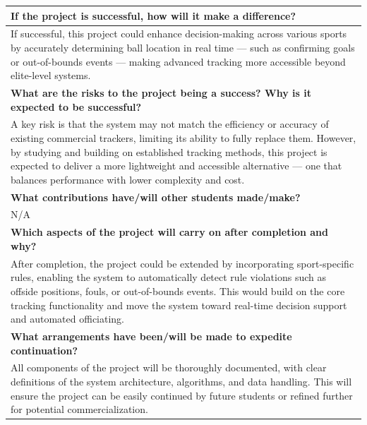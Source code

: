 \documentclass[12pt,a4paper]{article}
\newcommand\sumheading{%
	\rowcolor[gray]{.9}%
	\centering\arraybackslash%
	\bfseries\normalsize}
\begin{document}
\begin{longtable}{|p{\dimexpr \linewidth-2\tabcolsep-2\arrayrulewidth}|}
	\hline%
	\sumheading  If the project is successful, how will it make a difference? \\
	\hline%
	If successful, this project could enhance decision-making across various sports by accurately determining ball location in real time — such as confirming goals or out-of-bounds events — making advanced tracking more accessible beyond elite-level systems. \\[1ex]
	
	\hline%
	\sumheading  What are the risks to the project being a success? Why is it expected to be successful? \\
	\hline%
	A key risk is that the system may not match the efficiency or accuracy of existing commercial trackers, limiting its ability to fully replace them. However, by studying and building on established tracking methods, this project is expected to deliver a more lightweight and accessible alternative — one that balances performance with lower complexity and cost. \\[1ex]
	
	\hline%
	\sumheading  What contributions have/will other students made/make? \\
	\hline%
	N/A \\[1ex]
	
	\hline%
	\sumheading  Which aspects of the project will carry on after completion and why? \\
	\hline%
	After completion, the project could be extended by incorporating sport-specific rules, enabling the system to automatically detect rule violations such as offside positions, fouls, or out-of-bounds events. This would build on the core tracking functionality and move the system toward real-time decision support and automated officiating. \\[1ex]
	
	\hline%
	\sumheading  What arrangements have been/will be made to expedite continuation? \\
	\hline%
	All components of the project will be thoroughly documented, with clear definitions of the system architecture, algorithms, and data handling. This will ensure the project can be easily continued by future students or refined further for potential commercialization.\\[1ex]
	
	\hline%
\end{longtable}
\newpage
\end{document}
